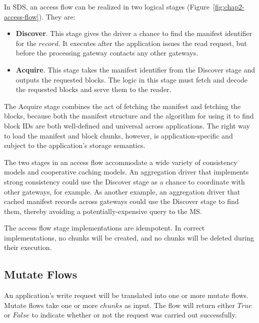 In SDS, an access flow can be realized in two logical stages
(Figure~\ref{fig:chap2-access-flow}).  They are:

\begin{itemize}
    \item \textbf{Discover}.  This stage gives the driver a chance to find the
manifest identifier for the $record$.  It executes after the application issues
the read request, but before the processing gateway contacts any other gateways.
    \item \textbf{Acquire}.  This stage takes the manifest identifier from the
Discover stage and outputs the requested blocks.  The logic in this 
stage must fetch and decode the requested blocks and serve them to the reader.
\end{itemize}

The Acquire stage combines the act of fetching the manifest and fetching the
blocks, because both the manifest structure and the algorithm for using it to
find block IDs are both well-defined and universal across applications.  The 
right way to load the manifest and block chunks, however, is
application-specific and subject to the application's storage semantics.

The two stages in an access flow accommodate a wide
variety of consistency models and cooperative caching models.  An
aggregation driver that implements strong consistency could use the Discover
stage as a chance to coordinate with other gateways, for example.  As
another example, an aggregation driver that cached manifest records
across gateways could use the Discover stage to find them, thereby avoiding a
potentially-expensive query to the MS.

The access flow stage implementations are idempotent.  In correct
implementations, no chunks will be created, and no chunks will be deleted
during their execution.

\subsection{Mutate Flows}

An application's write request will be translated into one or more mutate flows.
Mutate flows take one or more $chunks$ as input.  The flow will return
either $True$ or $False$ to indicate whether or not the request was
carried out successfully.

